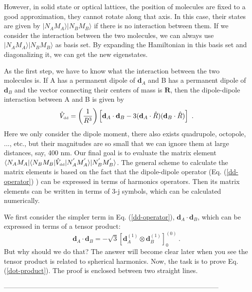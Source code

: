 However, in solid state or optical lattices, the position of molecules are fixed to a good approximation, they cannot rotate along that axis. In this case, their states are given by $|N_{A}M_{A}\rangle |N_{B}M_{B}\rangle$ if there is no interaction between them. If we consider the interaction between the two molecules, we can always use $|N_{A}M_{A}\rangle |N_{B}M_{B}\rangle$ as basis set. By expanding the Hamiltonian in this basis set and diagonalizing it, we can get the new eigenstates.

As the first step, we have to know what the interaction between the two molecules is. If A has a permanent dipole of $\mathbf{d}_{A}$ and B has a permanent dipole of $\mathbf{d}_{B}$ and the vector connecting their centers of mass is $\mathbf{R}$, then the dipole-dipole interaction between A and B is given by
\begin{equation}
\hat{V}_{\mbox{\tiny dd}} = \left(\frac{1}{R^3}\right)\left[ \mathbf{d}_{A}\cdot\mathbf{d}_{B}-3(\mathbf{d}_{A}\cdot\hat{R})(\mathbf{d}_{B}\cdot\hat{R})\right]  \ . \label{dd-operator}
\end{equation}
Here we only consider the dipole moment, there also exists quadrupole, octopole, ..., etc., but their magnitudes are so small that we can ignore them at large distances, say, 400 nm. Our final goal is to evaluate the matrix element $\langle N_{A}M_{A}|\langle N_{B}M_{B} | \hat{V}_{\mbox{\tiny dd}}|N_{A}^{'}M_{A}^{'}\rangle |N_{B}^{'}M_{B}^{'}      \rangle$. The general scheme to calculate the matrix elements is based on the fact that the dipole-dipole operator (Eq. (\ref{dd-operator}) ) can be expressed in terms of harmonics operators. Then its matrix elements can be written in terms of 3-j symbols, which can be calculated numerically. 

We first consider the simpler term in Eq. (\ref{dd-operator}), $\mathbf{d}_{A}\cdot\mathbf{d}_{B}$, which can be expressed in terms of a tensor product:
\begin{equation}
\mathbf{d}_{A}\cdot\mathbf{d}_{B} = - \sqrt{3} \left[ \mathbf{d}_{A}^{(1)} \otimes \mathbf{d}_{B}^{(1)} \right]_{0}^{(0)} \ . \label{dot-product}
\end{equation}
But why should we do that? The answer will become clear later when you see the tensor product is related to spherical harmonics. Now, the task is to prove Eq. (\ref{dot-product}). The proof is enclosed between two straight lines. 

-----------------------------------------------------------------------------------------------

